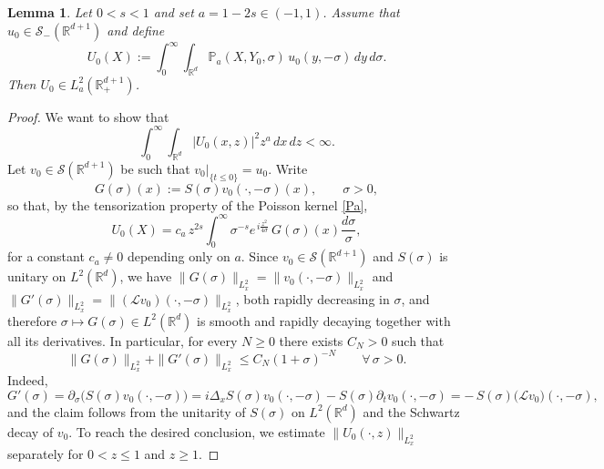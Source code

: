 \documentclass[10pt,a4paper]{amsart}
\newtheorem{lemma}{Lemma}
\newcommand{\Le}{\mathcal L}
\def \R {\mathbb{R}}
\def \RNu {\mathbb{R}^{d+1}}
\newcommand{\Rd}{\mathbb R^d}
\newcommand{\Sm}{\mathscr S_-(\RNu)}
\begin{document}
\begin{lemma}\label{L:U0L2}
Let $0<s<1$ and set $a=1-2s\in(-1,1)$. Assume that
$u_0\in \Sm$ and define
\begin{equation}\label{lift2}
U_0(X) := \int_0^\infty\int_{\R^d}
\mathbb P_a(X,Y_0,\sigma)\,u_0(y,-\sigma)\,dy\,d\sigma.
\end{equation}
Then $U_0\in L_a^2(\R^{d+1}_+)$.
\end{lemma}

\begin{proof}
We want to show that
\begin{equation}\label{goal}
\int_0^\infty\int_{\Rd}|U_0(x,z)|^2 z^a\,dx\,dz<\infty.
\end{equation}
 Let $v_0\in \mathscr S(\RNu)$ be such that $v_0|_{\{t\le 0\}} = u_0$. Write
\[
G(\sigma)(x):=S(\sigma)v_0(\cdot,-\sigma)(x),
\qquad \sigma>0,
\]
so that, by the tensorization property of the Poisson kernel \eqref{Pa},
\[
U_0(X)
=
c_a\,z^{2s}\int_0^\infty \sigma^{-s}
e^{\,i\frac{z^2}{4\sigma}}\,G(\sigma)(x)\frac{d\sigma}{\sigma},
\]
for a constant $c_a\neq 0$ depending only on $a$.
Since $v_0\in\mathscr S(\RNu)$ and $S(\sigma)$ is unitary on $L^2(\Rd)$, we have $\|G(\sigma)\|_{L^2_x}=\|v_0(\cdot,-\sigma)\|_{L^2_x}$ and $\|G'(\sigma)\|_{L^2_x}=\|(\Le v_0)(\cdot,-\sigma)\|_{L^2_x}$, both rapidly decreasing in $\sigma$, and therefore
$\sigma\mapsto G(\sigma)\in L^2(\Rd)$ is smooth and rapidly decaying together
with all its derivatives. In particular, for every $N\ge 0$ there exists
$C_N>0$ such that
\[
\|G(\sigma)\|_{L^2_x}+\|G'(\sigma)\|_{L^2_x}
\le C_N(1+\sigma)^{-N}
\qquad\forall\,\sigma>0.
\]
Indeed,
\begin{equation}\label{Gprime}
G'(\sigma)
=
\partial_\sigma\bigl(S(\sigma)v_0(\cdot,-\sigma)\bigr)
=
i\Delta_xS(\sigma)v_0(\cdot,-\sigma)
-
S(\sigma)\partial_t v_0(\cdot,-\sigma)
=
-\,S(\sigma)\bigl(\Le v_0\bigr)(\cdot,-\sigma),
\end{equation}
and the claim follows from the unitarity of
$S(\sigma)$ on $L^2(\R^d)$ and the Schwartz decay of $v_0$.
To reach the desired conclusion, we estimate $\|U_0(\cdot,z)\|_{L^2_x}$ separately for $0<z\le 1$ and $z\ge 1$.


\end{proof}
\end{document}
